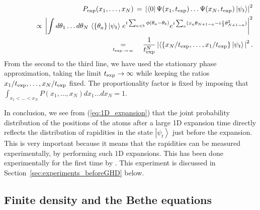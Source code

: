 \documentclass[onecolumn,amsfonts,showpacs,superscriptaddress]{revtex4-1}
\begin{document}
\begin{eqnarray}
    \label{eq:1D_expansion}
\nonumber    && P_{\rm exp}(x_1, \dots, x_N) \, =\, \left| \left< 0 \right| \Psi(x_1,t_{\rm exp}) \dots \Psi(x_N,t_{\rm exp}) \left| \psi_t \right>  \right|^2 \\
\nonumber    && \qquad \quad  \propto \,  \left| \int d\theta_1 \dots d\theta_N  \, \left< \{ \theta_a\} \left| \psi_t \right>\right. e^{i \sum_{a<b} \phi( \theta_a - \theta_b) }  e^{i \sum_a  ( x_a \theta_{N+1-a} - i \frac{t}{2} \theta_{N+1-a}^2) } \right|^2 \\
    &&  \qquad  \underset{t_{\rm exp. \rightarrow \infty}}{=}  \quad  \frac{1}{t_{\rm exp}^N} \left| \left< \{ x_N/t_{\rm exp}, \dots , x_1/t_{\rm exp} \} \left| \psi_t \right>\right. \right|^2  .
\end{eqnarray}
From the second to the third line, we have used the stationary phase approximation, taking the limit $t_{\rm exp} \rightarrow \infty$ while keeping the ratios $x_1/t_{\rm exp}, \dots , x_N/t_{\rm exp}$ fixed. The proportionality factor is fixed by imposing that $\int_{x_1<\dots<x_N} P(x_1,\dots , x_N) dx_1 \dots dx_N = 1$.

In conclusion, we see from (\ref{eq:1D_expansion}) that the joint probability distribution of the positions of the atoms after a large 1D expansion time directly reflects the distribution of rapidities in the state $\left| \psi_t \right>$ just before the expansion. This is very important because it means that the rapidities can be measured experimentally, by performing such 1D expansions. This has been done experimentally for the first time by \cite{wilson_observation_2020}. This experiment is discussed in Section~\ref{sec:experiments_beforeGHD} below.




\subsection{Finite density and the Bethe equations}
\end{document}
